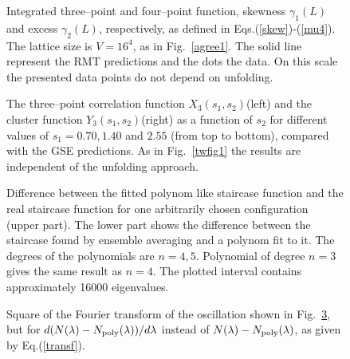 \begin{figure}
\begin{minipage}{7.5cm}
\centerline{}
\end{minipage}
\hfill
\begin{minipage}{7.5cm}
\centerline{}
\end{minipage}
\caption{Integrated three--point and four--point function, 
  skewness $\gamma_1(L)$ and excess $\gamma_2(L)$, respectively, as
  defined in Eqs.(\protect\ref{skew})-(\protect\ref{mu4}). The lattice
  size is $V=16^4$, as in Fig.~\protect\ref{agree1}.  The solid line
  represent the RMT predictions and the dots the data. On this scale
  the presented data points do not depend on unfolding.
  \label{agree2}}
\end{figure}

\begin{figure}
\begin{minipage}{7.5cm}
\centerline{}
\end{minipage}
\begin{minipage}{7.5cm}
\centerline{}
\end{minipage}
\caption{\label{twfig2}
  The three--point correlation function $X_3(s_1,s_2)$(left) and the
  cluster function $Y_3(s_1,s_2)$(right) as a function of $s_2$ for
  different values of $s_1=0.70, 1.40$ and $2.55$ (from top to
  bottom), compared with the GSE predictions. As in
  Fig.~\protect\ref{twfig1} the results are independent of the
  unfolding approach.}
\end{figure}

\begin{figure}
\caption{Difference between the fitted polynom like staircase function and
  the real staircase function for one arbitrarily chosen  configuration (upper
  part). The lower part shows the difference between the staircase
  found by ensemble averaging and a polynom fit to it. The degrees of
  the polynomials are $n=4,5$. Polynomial of degree $n=3$ gives the same
  result as $n=4$.
  The plotted interval contains approximately 16000 eigenvalues.
\label{diff}}
\end{figure}

\begin{figure}
\caption{Square of the Fourier transform of the oscillation shown in
  Fig.~\protect\ref{diff}, but for
  $d(N(\lambda)-N_{\rm poly}(\lambda))/d\lambda$ instead of
  $N(\lambda)-N_{\rm poly}(\lambda)$, as given by
  Eq.(\protect\ref{transf}).
\label{spectrum}}
\end{figure}

